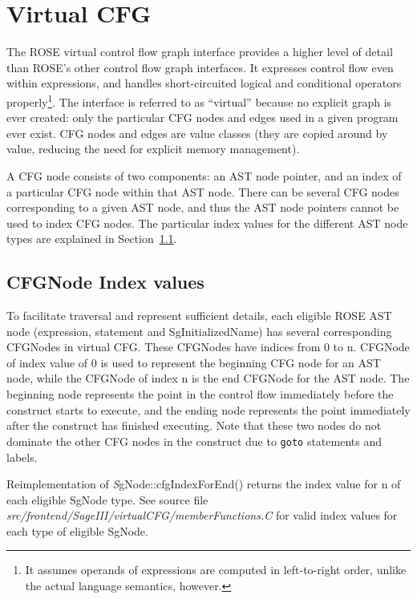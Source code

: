 \chapter{Virtual CFG}

The ROSE virtual control flow graph interface provides a higher level of
detail than ROSE's other control flow graph interfaces.  It expresses
control flow even within expressions, and handles short-circuited logical
and conditional operators properly\footnote{It assumes operands of
expressions are computed in left-to-right order, unlike the actual language
semantics, however.}.  The interface is referred to as ``virtual'' because
no explicit graph is ever created: only the particular CFG nodes and edges
used in a given program ever exist.  CFG nodes and edges are value classes
(they are copied around by value, reducing the need for explicit memory
management).

A CFG node consists of two components: an AST node pointer, and an index of
a particular CFG node within that AST node.  There can be several CFG nodes
corresponding to a given AST node, and thus the AST node pointers cannot be
used to index CFG nodes.  The particular index values for the different AST
node types are explained in Section~\ref{cfg_index_values}.

\section{CFGNode Index values}
\label{cfg_index_values}
To facilitate traversal and represent sufficient details,
each eligible ROSE AST node (expression, statement and SgInitializedName)
has several corresponding CFGNodes in virtual CFG. 
These CFGNodes have indices from 0 to n. CFGNode of index value of 0 is 
used to represent the beginning CFG node for an AST node, while the CFGNode
of index n is the end CFGNode for the AST node.
The
beginning node represents the point in the control flow immediately before
the construct starts to execute, and the ending node represents the point
immediately after the construct has finished executing.  Note that these
two nodes do not dominate the other CFG nodes in the construct due to
\lstinline{goto} statements and labels.

Reimplementation of {\textit SgNode::cfgIndexForEnd()} returns the index value for n of each
eligible SgNode type. See source file
\textit{src/frontend/SageIII/virtualCFG/memberFunctions.C} for valid index
values for each type of eligible SgNode. 


